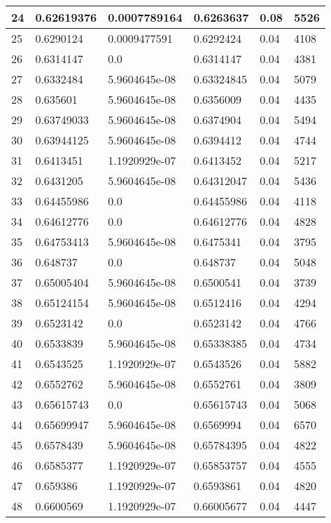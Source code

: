 \begin{longtable}{|l|l|l|l|l|l|}
24 & 0.62619376 & 0.0007789164 & 0.6263637 & 0.08 & 5526 \\ \hline 
25 & 0.6290124 & 0.0009477591 & 0.6292424 & 0.04 & 4108 \\ \hline 
26 & 0.6314147 & 0.0 & 0.6314147 & 0.04 & 4381 \\ \hline 
27 & 0.6332484 & 5.9604645e-08 & 0.63324845 & 0.04 & 5079 \\ \hline 
28 & 0.635601 & 5.9604645e-08 & 0.6356009 & 0.04 & 4435 \\ \hline 
29 & 0.63749033 & 5.9604645e-08 & 0.6374904 & 0.04 & 5494 \\ \hline 
30 & 0.63944125 & 5.9604645e-08 & 0.6394412 & 0.04 & 4744 \\ \hline 
31 & 0.6413451 & 1.1920929e-07 & 0.6413452 & 0.04 & 5217 \\ \hline 
32 & 0.6431205 & 5.9604645e-08 & 0.64312047 & 0.04 & 5436 \\ \hline 
33 & 0.64455986 & 0.0 & 0.64455986 & 0.04 & 4118 \\ \hline 
34 & 0.64612776 & 0.0 & 0.64612776 & 0.04 & 4828 \\ \hline 
35 & 0.64753413 & 5.9604645e-08 & 0.6475341 & 0.04 & 3795 \\ \hline 
36 & 0.648737 & 0.0 & 0.648737 & 0.04 & 5048 \\ \hline 
37 & 0.65005404 & 5.9604645e-08 & 0.6500541 & 0.04 & 3739 \\ \hline 
38 & 0.65124154 & 5.9604645e-08 & 0.6512416 & 0.04 & 4294 \\ \hline 
39 & 0.6523142 & 0.0 & 0.6523142 & 0.04 & 4766 \\ \hline 
40 & 0.6533839 & 5.9604645e-08 & 0.65338385 & 0.04 & 4734 \\ \hline 
41 & 0.6543525 & 1.1920929e-07 & 0.6543526 & 0.04 & 5882 \\ \hline 
42 & 0.6552762 & 5.9604645e-08 & 0.6552761 & 0.04 & 3809 \\ \hline 
43 & 0.65615743 & 0.0 & 0.65615743 & 0.04 & 5068 \\ \hline 
44 & 0.65699947 & 5.9604645e-08 & 0.6569994 & 0.04 & 6570 \\ \hline 
45 & 0.6578439 & 5.9604645e-08 & 0.65784395 & 0.04 & 4822 \\ \hline 
46 & 0.6585377 & 1.1920929e-07 & 0.65853757 & 0.04 & 4555 \\ \hline 
47 & 0.659386 & 1.1920929e-07 & 0.6593861 & 0.04 & 4820 \\ \hline 
48 & 0.6600569 & 1.1920929e-07 & 0.66005677 & 0.04 & 4447 \\ \hline 

\end{longtable}
